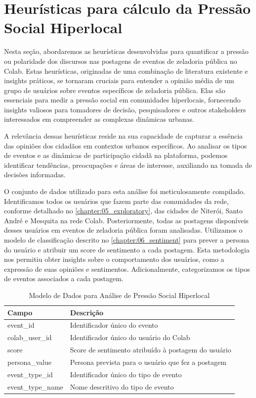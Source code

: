 \section{Heurísticas para cálculo da Pressão Social Hiperlocal}

Nesta seção, abordaremos as heurísticas desenvolvidas para quantificar a pressão ou polaridade dos discursos nas postagens de eventos de zeladoria pública no Colab. Estas heurísticas, originadas de uma combinação de literatura existente e insights práticos, se tornaram cruciais para entender a opinião média de um grupo de usuários sobre eventos específicos de zeladoria pública. Elas são essenciais para medir a pressão social em comunidades hiperlocais, fornecendo insights valiosos para tomadores de decisão, pesquisadores e outros stakeholders interessados em compreender as complexas dinâmicas urbanas.

A relevância dessas heurísticas reside na sua capacidade de capturar a essência das opiniões dos cidadãos em contextos urbanos específicos. Ao analisar os tipos de eventos e as dinâmicas de participação cidadã na plataforma, podemos identificar tendências, preocupações e áreas de interesse, auxiliando na tomada de decisões informadas.

O conjunto de dados utilizado para esta análise foi meticulosamente compilado. Identificamos todos os usuários que fazem parte das comunidades da rede, conforme detalhado no \autoref{chapter:05_exploratory}, das cidades de Niterói, Santo André e Mesquita na rede Colab. Posteriormente, todas as postagens disponíveis desses usuários em eventos de zeladoria pública foram analisadas. Utilizamos o modelo de classificação descrito no \autoref{chapter:06_sentiment} para prever a persona do usuário e atribuir um score de sentimento a cada postagem. Esta metodologia nos permitiu obter insights sobre o comportamento dos usuários, como a expressão de suas opiniões e sentimentos. Adicionalmente, categorizamos os tipos de eventos associados a cada postagem.

\begin{table}[htbp]
	\centering
	\caption{Modelo de Dados para Análise de Pressão Social Hiperlocal}
	\begin{tabular}{ll}
		\toprule
		\textbf{Campo}    & \textbf{Descrição}                                  \\
		\midrule
		event\_id         & Identificador único do evento                       \\
		colab\_user\_id   & Identificador único do usuário do Colab             \\
		score             & Score de sentimento atribuído à postagem do usuário \\
		persona\_value    & Persona prevista para o usuário que fez a postagem  \\
		event\_type\_id   & Identificador único do tipo de evento               \\
		event\_type\_name & Nome descritivo do tipo de evento                   \\
		\bottomrule
	\end{tabular}
	\label{tab:modelo-dados-barometro}
\end{table}

